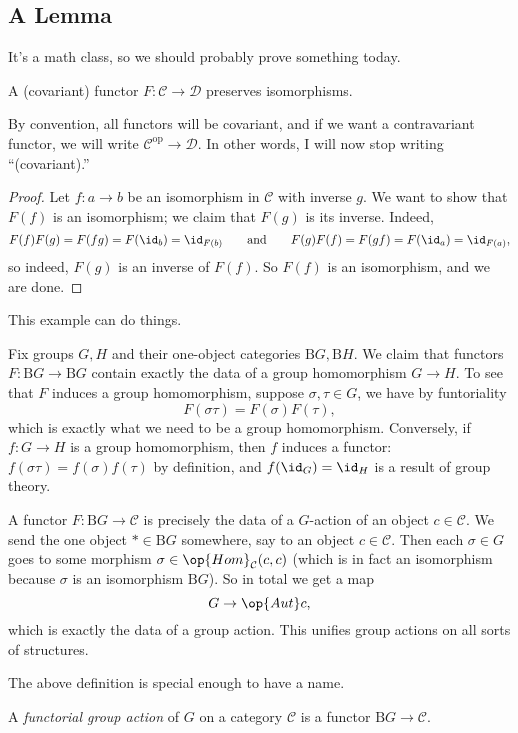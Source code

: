 \documentclass[../notes.tex]{subfiles}
\begin{document}
\subsection{A Lemma}
It's a math class, so we should probably prove something today.
\begin{theorem}
	A (covariant) functor $F:\mathcal C\to\mathcal D$ preserves isomorphisms.
\end{theorem}
\begin{remark}
	By convention, all functors will be covariant, and if we want a contravariant functor, we will write $\mathcal C^\mathrm{op}\to\mathcal D$. In other words, I will now stop writing ``(covariant).''
\end{remark}
\begin{proof}
	Let $f:a\to b$ be an isomorphism in $\mathcal C$ with inverse $g$. We want to show that $F(f)$ is an isomorphism; we claim that $F(g)$ is its inverse. Indeed,
	\[F(f)F(g)=F(fg)=F(\id_b)=\id_{F(b)}\qquad\text{and}\qquad F(g)F(f)=F(gf)=F(\id_a)=\id_{F(a)},\]
	so indeed, $F(g)$ is an inverse of $F(f)$. So $F(f)$ is an isomorphism, and we are done.
\end{proof}
This example can do things.
\begin{example}
	Fix groups $G,H$ and their one-object categories $\mathrm BG,\mathrm BH$. We claim that functors $F:\mathrm BG\to\mathrm BG$ contain exactly the data of a group homomorphism $G\to H$. To see that $F$ induces a group homomorphism, suppose $\sigma,\tau\in G$, we have by funtoriality
	\[F(\sigma\tau)=F(\sigma)F(\tau),\]
	which is exactly what we need to be a group homomorphism. Conversely, if $f:G\to H$ is a group homomorphism, then $f$ induces a functor: $f(\sigma\tau)=f(\sigma)f(\tau)$ by definition, and $f(\id_G)=\id_H$ is a result of group theory.
\end{example}
\begin{example}
	A functor $F:\mathrm BG\to\mathcal C$ is precisely the data of a $G$-action of an object $c\in\mathcal C$. We send the one object $*\in\mathrm BG$ somewhere, say to an object $c\in\mathcal C$. Then each $\sigma\in G$ goes to some morphism $\sigma\in\op{Hom}_\mathcal C(c,c)$ (which is in fact an isomorphism because $\sigma$ is an isomorphism $\mathrm BG$). So in total we get a map
	\[G\to\op{Aut}c,\]
	which is exactly the data of a group action. This unifies group actions on all sorts of structures.
\end{example}
The above definition is special enough to have a name.
\begin{definition}
	A \textit{functorial group action} of $G$ on a category $\mathcal C$ is a functor $\mathrm BG\to\mathcal C$.
\end{definition}
\end{document}
